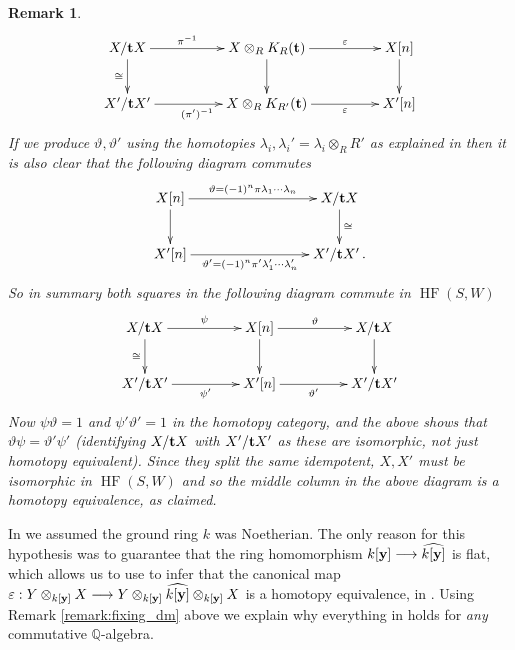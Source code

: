 \documentclass[english,letter paper,12pt,leqno]{article}
\theoremstyle{example}
\newtheorem{remark}[theorem]{Remark}
\numberwithin{equation}{section}
\DeclareMathOperator{\HF}{HF}
\begin{document}
\begin{remark}
\[
\xymatrix@C+2pc{
X/\bold{t} X \ar[d]_-{\cong} \ar[r]^-{\pi^{-1}} & X \otimes_R K_R(\bold{t}) \ar[d] \ar[r]^-\varepsilon & X[n] \ar[d]\\
X'/\bold{t} X' \ar[r]_{(\pi')^{-1}} & X \otimes_R K_{R'}(\bold{t}) \ar[r]_-{\varepsilon} & X'[n]
}
\]
If we produce $\vartheta, \vartheta'$ using the homotopies $\lambda_i, \lambda_i' = \lambda_i \otimes_R R'$ as explained in \cite[\S 4]{pushforward} then it is also clear that the following diagram commutes
\[
\xymatrix@C+5pc{
X[n] \ar[d] \ar[r]^-{\vartheta = (-1)^n \pi \lambda_1 \cdots \lambda_n} & X/\bold{t} X \ar[d]^-{\cong} \\
X'[n] \ar[r]_-{\vartheta' = (-1)^n \pi' \lambda_1' \cdots \lambda_n'} & X'/\bold{t} X'\,.
}
\]
So in summary both squares in the following diagram commute in $\HF(S,W)$
\[
\xymatrix@C+2pc{
X/\bold{t} X \ar[d]_-{\cong} \ar[r]^-{\psi} & X[n] \ar[d] \ar[r]^-\vartheta & X/\bold{t} X \ar[d]\\
X'/\bold{t} X' \ar[r]_-{\psi'} & X'[n] \ar[r]_-{\vartheta'} & X'/\bold{t} X'
}
\]
Now $\psi \vartheta = 1$ and $\psi' \vartheta' = 1$ in the homotopy category, and the above shows that $\vartheta \psi = \vartheta' \psi'$ (identifying $X/\bold{t} X$ with $X'/\bold{t} X'$ as these are isomorphic, not just homotopy equivalent). Since they split the same idempotent, $X, X'$ must be isomorphic in $\HF(S,W)$ and so the middle column in the above diagram is a homotopy equivalence, as claimed.
\end{remark}

In \cite{cut} we assumed the ground ring $k$ was Noetherian. The only reason for this hypothesis was to guarantee that the ring homomorphism $k[\bold{y}] \longrightarrow \widehat{k[\bold{y}]}$ is flat, which allows us to use \cite[Remark 7.7]{pushforward} to infer that the canonical map $\varepsilon: Y \otimes_{k[\bold{y}]} X \longrightarrow Y \otimes_{k[\bold{y}]} \widehat{k[\bold{y}]} \otimes_{k[\bold{y}]} X$ is a homotopy equivalence, in \cite[\S 4.3]{cut}. Using Remark \ref{remark:fixing_dm} above we explain why everything in \cite{cut} holds for \emph{any} commutative $\mathbb{Q}$-algebra.
\end{document}
